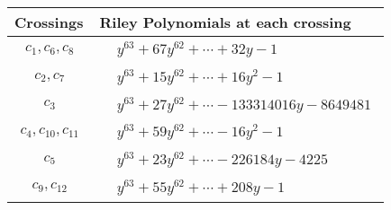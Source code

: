 \documentclass[1p]{elsarticle_modified}
\theoremstyle{definition}
\begin{document}
\begin{tabular}{m{50pt}|m{274pt}}
Crossings & \hspace{64pt}Riley Polynomials at each crossing \\
\hline $$\begin{aligned}c_{1},c_{6},c_{8}\end{aligned}$$&$\begin{aligned}
&y^{63}+67 y^{62}+\cdots+32 y-1
\end{aligned}$\\
\hline $$\begin{aligned}c_{2},c_{7}\end{aligned}$$&$\begin{aligned}
&y^{63}+15 y^{62}+\cdots+16 y^2-1
\end{aligned}$\\
\hline $$\begin{aligned}c_{3}\end{aligned}$$&$\begin{aligned}
&y^{63}+27 y^{62}+\cdots-133314016 y-8649481
\end{aligned}$\\
\hline $$\begin{aligned}c_{4},c_{10},c_{11}\end{aligned}$$&$\begin{aligned}
&y^{63}+59 y^{62}+\cdots-16 y^2-1
\end{aligned}$\\
\hline $$\begin{aligned}c_{5}\end{aligned}$$&$\begin{aligned}
&y^{63}+23 y^{62}+\cdots-226184 y-4225
\end{aligned}$\\
\hline $$\begin{aligned}c_{9},c_{12}\end{aligned}$$&$\begin{aligned}
&y^{63}+55 y^{62}+\cdots+208 y-1
\end{aligned}$\\
\hline
\end{tabular}
\vskip 2pc
\end{document}
